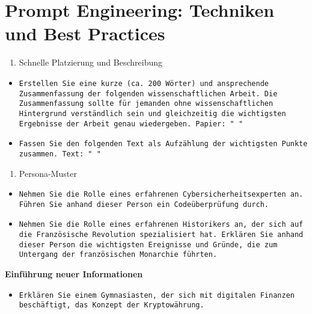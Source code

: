 \documentclass[12pt,a4paper]{scrartcl}
\newcommand{\tightlist}{
  \setlength{\itemsep}{0pt}\setlength{\parskip}{0pt}
}
\begin{document}
\hypertarget{prompt-engineering-techniken-und-best-practices}{%
\section{Prompt Engineering: Techniken und Best
Practices}\label{prompt-engineering-techniken-und-best-practices}}

\begin{enumerate}
\def\labelenumi{\arabic{enumi})}
\tightlist
\item
  Schnelle Platzierung und Beschreibung
\end{enumerate}

\begin{itemize}
\item
  {\lstinline!Erstellen Sie eine kurze (ca. 200 Wörter) und ansprechende Zusammenfassung der folgenden wissenschaftlichen Arbeit. Die Zusammenfassung sollte für jemanden ohne wissenschaftlichen Hintergrund verständlich sein und gleichzeitig die wichtigsten Ergebnisse der Arbeit genau wiedergeben. Papier: " "!}
\item
  {\lstinline!Fassen Sie den folgenden Text als Aufzählung der wichtigsten Punkte zusammen. Text: " "!}
\end{itemize}

\begin{enumerate}
\def\labelenumi{\arabic{enumi})}
\setcounter{enumi}{1}
\tightlist
\item
  Persona-Muster
\end{enumerate}

\begin{itemize}
\item
  {\lstinline!Nehmen Sie die Rolle eines erfahrenen Cybersicherheitsexperten an. Führen Sie anhand dieser Person ein Codeüberprüfung durch.!}
\item
  {\lstinline!Nehmen Sie die Rolle eines erfahrenen Historikers an, der sich auf die Französische Revolution spezialisiert hat. Erklären Sie anhand dieser Person die wichtigsten Ereignisse und Gründe, die zum Untergang der französischen Monarchie führten.!}
\end{itemize}

\textbf{Einführung neuer Informationen}

\begin{itemize}
\tightlist
\item
  {\lstinline!Erklären Sie einem Gymnasiasten, der sich mit digitalen Finanzen beschäftigt, das Konzept der Kryptowährung.!}
\end{itemize}
\end{document}
